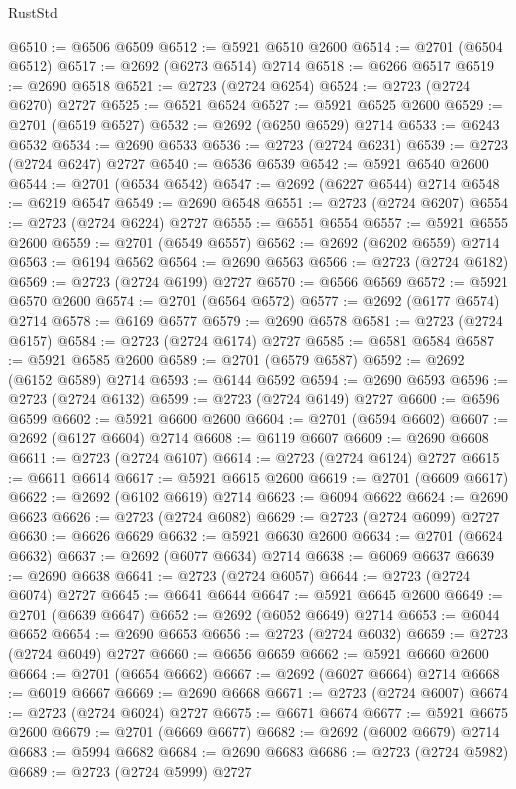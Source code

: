 \begin{lexlean}{RustStd}
\begin{coremodule}
@6510 := @6506 @6509
@6512 := @5921 @6510 @2600
@6514 := @2701 (@6504 @6512)
@6517 := @2692 (@6273 @6514) @2714
@6518 := @6266 @6517
@6519 := @2690 @6518
@6521 := @2723 (@2724 @6254)
@6524 := @2723 (@2724 @6270) @2727
@6525 := @6521 @6524
@6527 := @5921 @6525 @2600
@6529 := @2701 (@6519 @6527)
@6532 := @2692 (@6250 @6529) @2714
@6533 := @6243 @6532
@6534 := @2690 @6533
@6536 := @2723 (@2724 @6231)
@6539 := @2723 (@2724 @6247) @2727
@6540 := @6536 @6539
@6542 := @5921 @6540 @2600
@6544 := @2701 (@6534 @6542)
@6547 := @2692 (@6227 @6544) @2714
@6548 := @6219 @6547
@6549 := @2690 @6548
@6551 := @2723 (@2724 @6207)
@6554 := @2723 (@2724 @6224) @2727
@6555 := @6551 @6554
@6557 := @5921 @6555 @2600
@6559 := @2701 (@6549 @6557)
@6562 := @2692 (@6202 @6559) @2714
@6563 := @6194 @6562
@6564 := @2690 @6563
@6566 := @2723 (@2724 @6182)
@6569 := @2723 (@2724 @6199) @2727
@6570 := @6566 @6569
@6572 := @5921 @6570 @2600
@6574 := @2701 (@6564 @6572)
@6577 := @2692 (@6177 @6574) @2714
@6578 := @6169 @6577
@6579 := @2690 @6578
@6581 := @2723 (@2724 @6157)
@6584 := @2723 (@2724 @6174) @2727
@6585 := @6581 @6584
@6587 := @5921 @6585 @2600
@6589 := @2701 (@6579 @6587)
@6592 := @2692 (@6152 @6589) @2714
@6593 := @6144 @6592
@6594 := @2690 @6593
@6596 := @2723 (@2724 @6132)
@6599 := @2723 (@2724 @6149) @2727
@6600 := @6596 @6599
@6602 := @5921 @6600 @2600
@6604 := @2701 (@6594 @6602)
@6607 := @2692 (@6127 @6604) @2714
@6608 := @6119 @6607
@6609 := @2690 @6608
@6611 := @2723 (@2724 @6107)
@6614 := @2723 (@2724 @6124) @2727
@6615 := @6611 @6614
@6617 := @5921 @6615 @2600
@6619 := @2701 (@6609 @6617)
@6622 := @2692 (@6102 @6619) @2714
@6623 := @6094 @6622
@6624 := @2690 @6623
@6626 := @2723 (@2724 @6082)
@6629 := @2723 (@2724 @6099) @2727
@6630 := @6626 @6629
@6632 := @5921 @6630 @2600
@6634 := @2701 (@6624 @6632)
@6637 := @2692 (@6077 @6634) @2714
@6638 := @6069 @6637
@6639 := @2690 @6638
@6641 := @2723 (@2724 @6057)
@6644 := @2723 (@2724 @6074) @2727
@6645 := @6641 @6644
@6647 := @5921 @6645 @2600
@6649 := @2701 (@6639 @6647)
@6652 := @2692 (@6052 @6649) @2714
@6653 := @6044 @6652
@6654 := @2690 @6653
@6656 := @2723 (@2724 @6032)
@6659 := @2723 (@2724 @6049) @2727
@6660 := @6656 @6659
@6662 := @5921 @6660 @2600
@6664 := @2701 (@6654 @6662)
@6667 := @2692 (@6027 @6664) @2714
@6668 := @6019 @6667
@6669 := @2690 @6668
@6671 := @2723 (@2724 @6007)
@6674 := @2723 (@2724 @6024) @2727
@6675 := @6671 @6674
@6677 := @5921 @6675 @2600
@6679 := @2701 (@6669 @6677)
@6682 := @2692 (@6002 @6679) @2714
@6683 := @5994 @6682
@6684 := @2690 @6683
@6686 := @2723 (@2724 @5982)
@6689 := @2723 (@2724 @5999) @2727

\end{coremodule}
\end{lexlean}
